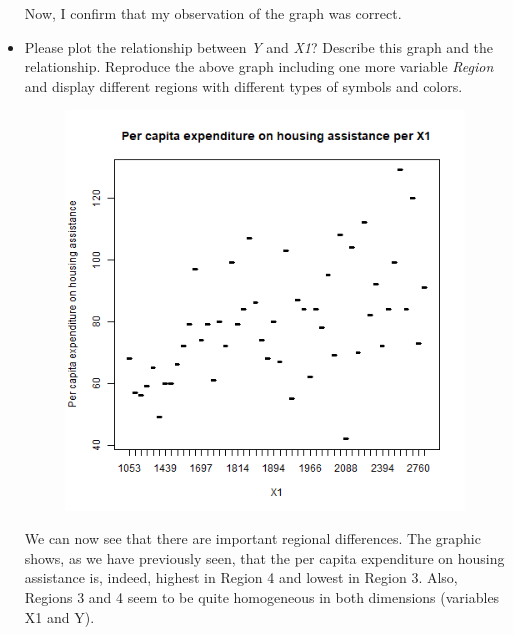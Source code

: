 \documentclass[12pt,letterpaper]{article}
\begin{document}
\begin{itemize}




Now, I confirm that my observation of the graph was correct.



\vspace{.5cm}


\item




Please plot the relationship between \emph{Y} and \emph{X1}? Describe this graph and the relationship. Reproduce the above graph including one more variable \emph{Region} and display different regions with different types of symbols and colors.

\begin{figure}[H]
	\centering
	\includegraphics[width=0.3\linewidth]{boxplot3.png}
\end{figure}



We can now see that there are important regional differences. The graphic shows, as we have previously seen, that the per capita expenditure on housing assistance is, indeed, highest in Region 4 and lowest in Region 3. Also, Regions 3 and 4 seem to be quite homogeneous in both dimensions (variables X1 and Y).

\end{itemize}
\end{document}
